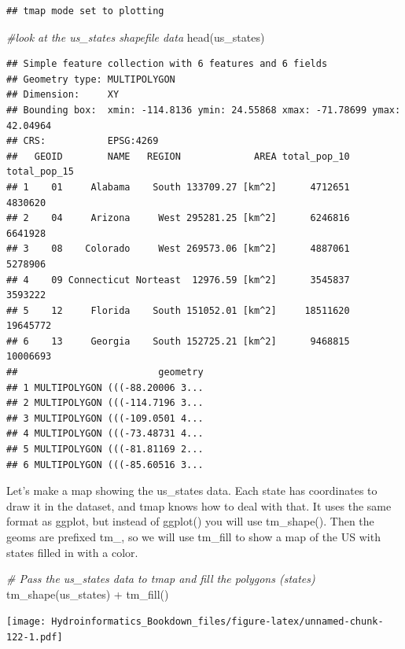 \documentclass[
]{book}
\newenvironment{Shaded}{\begin{snugshade}}{\end{snugshade}}
\newcommand{\CommentTok}[1]{\textcolor[rgb]{0.56,0.35,0.01}{\textit{#1}}}
\newcommand{\FunctionTok}[1]{\textcolor[rgb]{0.00,0.00,0.00}{#1}}
\newcommand{\NormalTok}[1]{#1}
\newcommand{\SpecialCharTok}[1]{\textcolor[rgb]{0.00,0.00,0.00}{#1}}
\begin{document}
\begin{verbatim}
## tmap mode set to plotting
\end{verbatim}

\begin{Shaded}
\begin{Highlighting}[]
\CommentTok{\#look at the us\_states shapefile data}
\FunctionTok{head}\NormalTok{(us\_states)}
\end{Highlighting}
\end{Shaded}

\begin{verbatim}
## Simple feature collection with 6 features and 6 fields
## Geometry type: MULTIPOLYGON
## Dimension:     XY
## Bounding box:  xmin: -114.8136 ymin: 24.55868 xmax: -71.78699 ymax: 42.04964
## CRS:           EPSG:4269
##   GEOID        NAME   REGION             AREA total_pop_10 total_pop_15
## 1    01     Alabama    South 133709.27 [km^2]      4712651      4830620
## 2    04     Arizona     West 295281.25 [km^2]      6246816      6641928
## 3    08    Colorado     West 269573.06 [km^2]      4887061      5278906
## 4    09 Connecticut Norteast  12976.59 [km^2]      3545837      3593222
## 5    12     Florida    South 151052.01 [km^2]     18511620     19645772
## 6    13     Georgia    South 152725.21 [km^2]      9468815     10006693
##                         geometry
## 1 MULTIPOLYGON (((-88.20006 3...
## 2 MULTIPOLYGON (((-114.7196 3...
## 3 MULTIPOLYGON (((-109.0501 4...
## 4 MULTIPOLYGON (((-73.48731 4...
## 5 MULTIPOLYGON (((-81.81169 2...
## 6 MULTIPOLYGON (((-85.60516 3...
\end{verbatim}

Let's make a map showing the us\_states data. Each state has coordinates to draw it in the dataset, and tmap knows how to deal with that. It uses the same format as ggplot, but instead of ggplot() you will use tm\_shape(). Then the geoms are prefixed tm\_, so we will use tm\_fill to show a map of the US with states filled in with a color.

\begin{Shaded}
\begin{Highlighting}[]
\CommentTok{\# Pass the us\_states data to tmap and fill the polygons (states)}
\FunctionTok{tm\_shape}\NormalTok{(us\_states) }\SpecialCharTok{+}
  \FunctionTok{tm\_fill}\NormalTok{() }
\end{Highlighting}
\end{Shaded}

\texttt{[image: Hydroinformatics\_Bookdown\_files/figure-latex/unnamed-chunk-122-1.pdf]}
\end{document}
